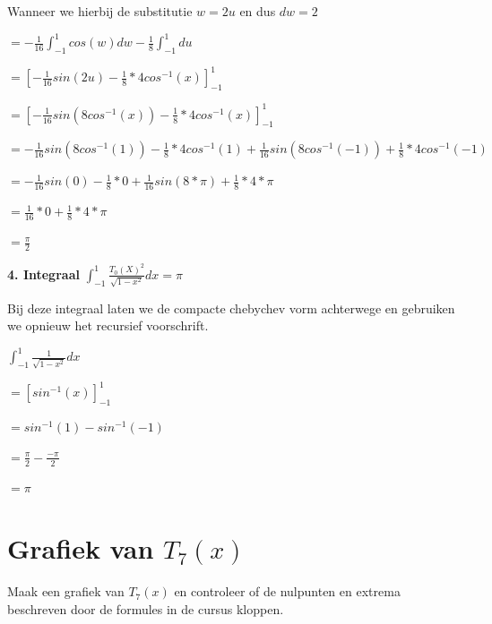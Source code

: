 \documentclass{article}
\begin{document}
\begin{flushleft}
Wanneer we hierbij de substitutie $w = 2u $ en dus $dw = 2$
\newline

$ = -\frac{1}{16} \int_{-1}^{1}  cos(w) dw -\frac{1}{8} \int_{-1}^{1}  du $
\newline

$ = [-\frac{1}{16} sin(2u)  -\frac{1}{8} * 4cos^{-1}(x)]^{1}_{-1} $
\newline

$ = [-\frac{1}{16} sin(8cos^{-1}(x))  -\frac{1}{8} * 4cos^{-1}(x)]^{1}_{-1} $
\newline

$ = -\frac{1}{16} sin(8cos^{-1}(1))  -\frac{1}{8} * 4cos^{-1}(1) +\frac{1}{16} sin(8cos^{-1}(-1))  +\frac{1}{8} * 4cos^{-1}(-1) $
\newline

$ = -\frac{1}{16} sin(0)  -\frac{1}{8} * 0 +\frac{1}{16} sin(8*\pi)  +\frac{1}{8} * 4*\pi $
\newline

$ =  \frac{1}{16} * 0  +\frac{1}{8} * 4*\pi $
\newline

$ = \frac{\pi}{2} $
\newline

\textbf{4. Integraal}
$ \int_{-1}^{1}  \frac{T_{0}(X)^{2}}{\sqrt{1-x^{2}}} dx = \pi $
\newline

Bij deze integraal laten we de compacte chebychev vorm achterwege en gebruiken we opnieuw het recursief voorschrift.
\newline

$ \int_{-1}^{1}  \frac{1}{\sqrt{1-x^{2}}} dx $
\newline

$ = [sin^{-1}(x)]^{1}_{-1} $
\newline

$ = sin^{-1}(1) - sin^{-1}(-1) $
\newline

$ = \frac{\pi}{2} - \frac{-\pi}{2} $
\newline

$ = \pi $

\section{Grafiek van $T_{7}(x)$}
Maak een grafiek van $ T_{7}(x) $  en  controleer of de nulpunten en extrema beschreven door de formules in de cursus kloppen.
\newline


\end{flushleft}
\end{document}

